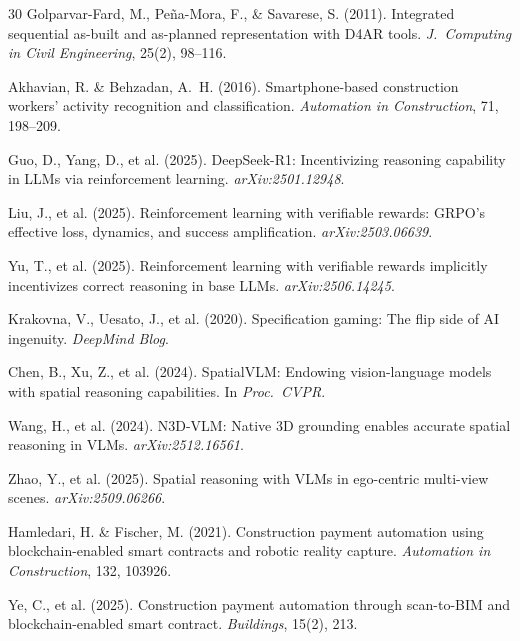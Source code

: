 \documentclass[sigconf,nonacm]{acmart}
\begin{document}
\begin{thebibliography}{30}
Golparvar-Fard, M., Pe\~{n}a-Mora, F., \& Savarese, S. (2011).
\newblock Integrated sequential as-built and as-planned representation with D4AR tools.
\newblock \textit{J.\ Computing in Civil Engineering}, 25(2), 98--116.

Akhavian, R. \& Behzadan, A.~H. (2016).
\newblock Smartphone-based construction workers' activity recognition and classification.
\newblock \textit{Automation in Construction}, 71, 198--209.

Guo, D., Yang, D., et al. (2025).
\newblock DeepSeek-R1: Incentivizing reasoning capability in LLMs via reinforcement learning.
\newblock \textit{arXiv:2501.12948}.

Liu, J., et al. (2025).
\newblock Reinforcement learning with verifiable rewards: GRPO's effective loss, dynamics, and success amplification.
\newblock \textit{arXiv:2503.06639}.

Yu, T., et al. (2025).
\newblock Reinforcement learning with verifiable rewards implicitly incentivizes correct reasoning in base LLMs.
\newblock \textit{arXiv:2506.14245}.

Krakovna, V., Uesato, J., et al. (2020).
\newblock Specification gaming: The flip side of AI ingenuity.
\newblock \textit{DeepMind Blog}.

Chen, B., Xu, Z., et al. (2024).
\newblock SpatialVLM: Endowing vision-language models with spatial reasoning capabilities.
\newblock In \textit{Proc.\ CVPR}.

Wang, H., et al. (2024).
\newblock N3D-VLM: Native 3D grounding enables accurate spatial reasoning in VLMs.
\newblock \textit{arXiv:2512.16561}.

Zhao, Y., et al. (2025).
\newblock Spatial reasoning with VLMs in ego-centric multi-view scenes.
\newblock \textit{arXiv:2509.06266}.

Hamledari, H. \& Fischer, M. (2021).
\newblock Construction payment automation using blockchain-enabled smart contracts and robotic reality capture.
\newblock \textit{Automation in Construction}, 132, 103926.

Ye, C., et al. (2025).
\newblock Construction payment automation through scan-to-BIM and blockchain-enabled smart contract.
\newblock \textit{Buildings}, 15(2), 213.


\end{thebibliography}
\end{document}
